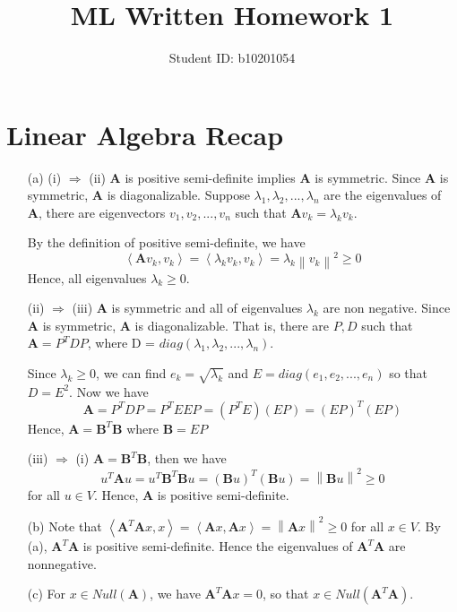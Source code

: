 \documentclass[12pt,a4paper]{article}
\title{ML Written Homework 1}
\author{Student ID: b10201054}
\begin{document}
\maketitle

\section{Linear Algebra Recap}

\begin{enumerate}
    \item [(a)] 
        (i) $\Rightarrow$ (ii) \textbf{A} is positive semi-definite implies \textbf{A} is symmetric. Since \textbf{A} is symmetric, \textbf{A} is diagonalizable.
        Suppose $\lambda_{1}, \lambda_{2}, ..., \lambda_{n}$ are the eigenvalues of \textbf{A}, there are eigenvectors $v_{1}, v_{2}, ..., v_{n}$ such that $\textbf{A}v_{k} = \lambda_{k}v_{k}$.

        By the definition of positive semi-definite, we have
        \[
            \left\langle \textbf{A}v_{k}, v_{k}\right\rangle = \left\langle \lambda_{k}v_{k}, v_{k} \right\rangle = \lambda_{k}\left\lVert v_k \right\rVert^2  \geq 0
        \]
        Hence, all eigenvalues $\lambda_{k} \geq 0$.

        (ii) $\Rightarrow$ (iii) \textbf{A} is symmetric and all of eigenvalues $\lambda_{k}$ are non negative. Since \textbf{A} is symmetric, \textbf{A} is diagonalizable.
        That is, there are $P, D$ such that $\textbf{A} = P^{T}DP$, where D = $diag(\lambda_{1}, \lambda_{2}, ..., \lambda_{n})$.

        Since $\lambda_{k} \geq 0$, we can find $e_{k} = \sqrt{\lambda_{k}}$ and $E = diag(e_{1}, e_{2}, ..., e_{n})$ so that $D = E^2$.
        Now we have
        \[
            \mathbf{A} = P^{T}DP = P^{T}EEP = (P^{T}E)(EP) = (EP)^{T}(EP)
        \]
        Hence, $\mathbf{A} = \mathbf{B}^{T}\mathbf{B}$ where $\mathbf{B} = EP$

        (iii) $\Rightarrow$ (i) $\mathbf{A} = \mathbf{B}^{T}\mathbf{B}$, then we have
        \[
            u^{T}\mathbf{A}u = u^{T}\mathbf{B}^{T} \mathbf{B}u = (\mathbf{B}u)^{T}(\mathbf{B}u) = \left\lVert \mathbf{B}u \right\rVert ^2 \geq 0
        \]
        for all $u \in V$. Hence, \textbf{A} is positive semi-definite. 
    \item[(b)]
        Note that $\left\langle \mathbf{A}^{T}\mathbf{A} x, x \right\rangle = \left\langle \mathbf{A}x, \mathbf{A}x\right\rangle = \left\lVert \mathbf{A}x \right\rVert^2 \geq 0$ for all $x\in V$.
        By (a), $\mathbf{A}^{T}\mathbf{A}$ is positive semi-definite. Hence the eigenvalues of $\mathbf{A}^{T}\mathbf{A}$ are nonnegative.
    \item[(c)]
        For $x\in Null(\mathbf{A})$, we have $\mathbf{A}^{T}\mathbf{A}x = 0$, so that $x\in Null(\mathbf{A}^{T}\mathbf{A})$.
        

\end{enumerate}
\end{document}
